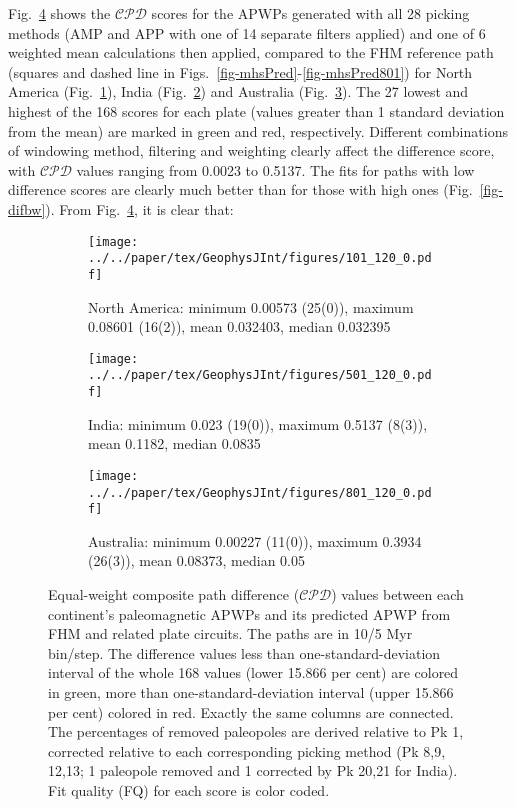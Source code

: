 Fig.~\ref{fig-dif} shows the $\mathcal{CPD}$ scores for the APWPs generated with
all 28 picking methods (AMP and APP with one of 14 separate filters applied) and
one of 6 weighted mean calculations then applied, compared to the FHM reference
path (squares and dashed line in Figs.~\ref{fig-mhsPred}-\ref{fig-mhsPred801})
for North America (Fig.~\ref{fig-na-dif}), India (Fig.~\ref{fig-in-dif}) and
Australia (Fig.~\ref{fig-au-dif}). The 27 lowest and highest of the 168
scores for each plate (values greater than 1 standard deviation from the mean)
are marked in green and red, respectively. Different combinations of windowing
method, filtering and weighting clearly affect the difference score, with
$\mathcal{CPD}$ values ranging from 0.0023 to 0.5137. The fits for paths with
low difference scores are clearly much better than for those with high ones
(Fig.~\ref{fig-difbw}). From Fig.~\ref{fig-dif}, it is clear that:

\begin{figure}
  \vspace*{-1.1cm}
  \centering
  \begin{subfigure}{.94\textwidth}
    \texttt{[image: ../../paper/tex/GeophysJInt/figures/101\_120\_0.pdf]}
    \caption{North America: minimum 0.00573 (25(0)), maximum
      0.08601 (16(2)), mean 0.032403, median 0.032395}\label{fig-na-dif} %
  \end{subfigure}
  \vspace{.1em} %
  \begin{subfigure}{.94\textwidth}
    \texttt{[image: ../../paper/tex/GeophysJInt/figures/501\_120\_0.pdf]}
    \caption{India: minimum 0.023 (19(0)), maximum 0.5137 (8(3)),
      mean 0.1182, median 0.0835}\label{fig-in-dif} %
  \end{subfigure}
  \vspace{.1em}
  \begin{subfigure}{.94\textwidth}
    \texttt{[image: ../../paper/tex/GeophysJInt/figures/801\_120\_0.pdf]}
    \caption{Australia: minimum 0.00227 (11(0)), maximum
      0.3934 (26(3)), mean 0.08373, median 0.05}\label{fig-au-dif} %
  \end{subfigure}
  \caption[$\mathcal{CPD}$ of each plate's paleomagnetic APWPs vs its FHM
    predicted APWP]{Equal-weight composite path difference ($\mathcal{CPD}$)
    values between each continent's paleomagnetic APWPs and its predicted APWP
    from FHM and related plate circuits. The paths are in 10/5 Myr bin/step. The
    difference values less than one-standard-deviation interval of the whole 168
    values (lower 15.866 per cent) are colored in green, more than
    one-standard-deviation interval (upper 15.866 per cent) colored in red.
    Exactly the same columns are connected. The percentages of removed
    paleopoles are derived relative to Pk 1, corrected relative to each
    corresponding picking method (Pk 8,9, 12,13; 1 paleopole removed and 1
    corrected by Pk 20,21 for India). Fit quality (FQ) for each score is color
    coded.}\label{fig-dif} %
\end{figure}

